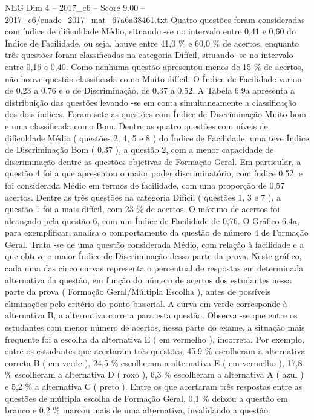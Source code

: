 \begin{textsample}{NEG Dim 4 – 2017\_c6 – Score 9.00 – 2017\_c6/enade\_2017\_mat\_67a6a38461.txt}
Quatro questões foram consideradas com índice de dificuldade Médio, situando -se no intervalo entre 0,41 e 0,60 do Índice de Facilidade, ou seja, houve entre 41,0 \% e 60,0 \% de acertos, enquanto três questões foram classificadas na categoria Difícil, situando -se no intervalo entre 0,16 e 0,40.
Como nenhuma questão apresentou menos de 15 \% de acertos, não houve questão classificada como Muito difícil.
O Índice de Facilidade variou de 0,23 a 0,76 e o de Discriminação, de 0,37 a 0,52.
A Tabela 6.9a apresenta a distribuição das questões levando -se em conta simultaneamente a classificação dos dois índices.
Foram sete as questões com Índice de Discriminação Muito bom e uma classificada como Bom.
Dentre as quatro questões com níveis de dificuldade Médio ( questões 2, 4, 5 e 8 ) do Índice de Facilidade, uma teve Índice de Discriminação Bom ( 0,37 ), a questão 2, com a menor capacidade de discriminação dentre as questões objetivas de Formação Geral.
Em particular, a questão 4 foi a que apresentou o maior poder discriminatório, com índice 0,52, e foi considerada Médio em termos de facilidade, com uma proporção de 0,57 acertos.
Dentre as três questões na categoria Difícil ( questões 1, 3 e 7 ), a questão 1 foi a mais difícil, com 23 \% de acertos.
O máximo de acertos foi alcançado pela questão 6, com um Índice de Facilidade de 0,76.
O Gráfico 6.4a, para exemplificar, analisa o comportamento da questão de número 4 de Formação Geral.
Trata -se de uma questão considerada Médio, com relação à facilidade e a que obteve o maior Índice de Discriminação dessa parte da prova.
Neste gráfico, cada uma das cinco curvas representa o percentual de respostas em determinada alternativa da questão, em função do número de acertos dos estudantes nessa parte da prova ( Formação Geral/Múltipla Escolha ), antes de possíveis eliminações pelo critério do ponto-bisserial.
A curva em verde corresponde à alternativa B, a alternativa correta para esta questão.
Observa -se que entre os estudantes com menor número de acertos, nessa parte do exame, a situação mais frequente foi a escolha da alternativa E ( em vermelho ), incorreta.
Por exemplo, entre os estudantes que acertaram três questões, 45,9 \% escolheram a alternativa correta B ( em verde ), 24,5 \% escolheram a alternativa E ( em vermelho ), 17,8 \% escolheram a alternativa D ( roxo ), 6,3 \% escolheram a alternativa A ( azul ) e 5,2 \% a alternativa C ( preto ).
Entre os que acertaram três respostas entre as questões de múltipla escolha de Formação Geral, 0,1 \% deixou a questão em branco e 0,2 \% marcou mais de uma alternativa, invalidando a questão.

\end{textsample}
